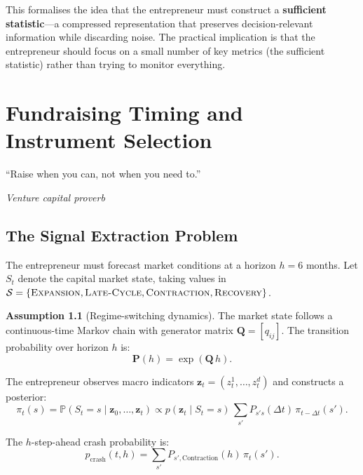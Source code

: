 \documentclass[12pt,a4paper,oneside]{book}
\theoremstyle{definition}
\newtheorem{assumption}[theorem]{Assumption}
\theoremstyle{remark}
\newcommand{\Prob}{\mathbb{P}}
\begin{document}
This formalises the idea that the entrepreneur must construct a
\textbf{sufficient statistic}---a compressed representation that preserves
decision-relevant information while discarding noise. The practical implication
is that the entrepreneur should focus on a small number of key metrics (the
sufficient statistic) rather than trying to monitor everything.

\chapter{Fundraising Timing and Instrument Selection}\label{ch:fundraising}

\epigraph{``Raise when you can, not when you need to.''}
{\textit{Venture capital proverb}}

\section{The Signal Extraction Problem}

The entrepreneur must forecast market conditions at a horizon $h = 6$ months. Let
$S_t$ denote the capital market state, taking values in
$\mathcal{S} = \{\textsc{Expansion}, \textsc{Late-Cycle}, \textsc{Contraction},
\textsc{Recovery}\}$.

\begin{assumption}[Regime-switching dynamics]\label{ass:regime}
The market state follows a continuous-time Markov chain with generator matrix
$\mathbf{Q} = [q_{ij}]$. The transition probability over horizon $h$ is:
\begin{equation}\label{eq:transition}
  \mathbf{P}(h) = \exp(\mathbf{Q}\,h).
\end{equation}
\end{assumption}

The entrepreneur observes macro indicators $\mathbf{z}_t = (z_t^1, \ldots, z_t^d)$ and
constructs a posterior:
\begin{equation}\label{eq:filter}
  \pi_t(s) = \Prob(S_t = s \mid \mathbf{z}_0, \ldots, \mathbf{z}_t)
  \propto p(\mathbf{z}_t \mid S_t = s)\,
    \sum_{s'} P_{s's}(\Delta t)\,\pi_{t-\Delta t}(s').
\end{equation}

The $h$-step-ahead crash probability is:
\begin{equation}\label{eq:crash_prob}
  p_{\text{crash}}(t, h) = \sum_{s'} P_{s',\text{Contraction}}(h)\,\pi_t(s').
\end{equation}
\end{document}
